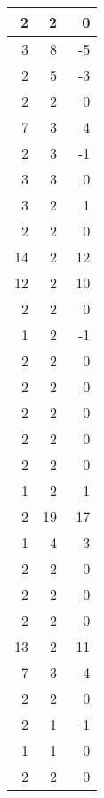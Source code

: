 \documentclass[11pt]{article}
\begin{document}
\begin{center}
\begin{tabular}{rrr}
       2  &          2  &         0  \\ \hline
       3  &          8  &        -5  \\ \hline
       2  &          5  &        -3  \\ \hline
       2  &          2  &         0  \\ \hline
       7  &          3  &         4  \\ \hline
       2  &          3  &        -1  \\ \hline
       3  &          3  &         0  \\ \hline
       3  &          2  &         1  \\ \hline
       2  &          2  &         0  \\ \hline
      14  &          2  &        12  \\ \hline
      12  &          2  &        10  \\ \hline
       2  &          2  &         0  \\ \hline
       1  &          2  &        -1  \\ \hline
       2  &          2  &         0  \\ \hline
       2  &          2  &         0  \\ \hline
       2  &          2  &         0  \\ \hline
       2  &          2  &         0  \\ \hline
       2  &          2  &         0  \\ \hline
       1  &          2  &        -1  \\ \hline
       2  &         19  &       -17  \\ \hline
       1  &          4  &        -3  \\ \hline
       2  &          2  &         0  \\ \hline
       2  &          2  &         0  \\ \hline
       2  &          2  &         0  \\ \hline
      13  &          2  &        11  \\ \hline
       7  &          3  &         4  \\ \hline
       2  &          2  &         0  \\ \hline
       2  &          1  &         1  \\ \hline
       1  &          1  &         0  \\ \hline
       2  &          2  &         0  \\ \hline

\end{tabular}
\end{center}
\end{document}
